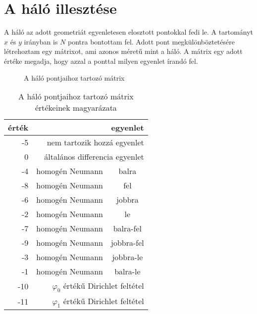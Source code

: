 \section{A háló illesztése}
A háló az adott geometriát egyenletesen elosztott pontokkal fedi le.
A tartományt $x$ és $y$ irányban is $N$ pontra bontottam fel.
Adott pont megkülönböztetésére létrehoztam egy mátrixot, ami azonos méretű mint a háló.
A mátrix egy adott értéke megadja, hogy azzal a ponttal milyen egyenlet írandó fel.
\begin{figure}[H]
\centering
\caption{A háló pontjaihoz tartozó mátrix} 
\end{figure}
\begin{table}
\centering
\begin{tabular}{|r|rc|}
\hline
érték & \multicolumn{2}{r|}{egyenlet}\\
\hline\hline
-5 & \multicolumn{2}{r|}{nem tartozik hozzá egyenlet}\\
0 & \multicolumn{2}{r|}{általános differencia egyenlet}\\
\hline
-4 & homogén Neumann & balra\\
-8 & homogén Neumann & fel\\
-6 & homogén Neumann & jobbra\\
-2 & homogén Neumann & le\\
-7 & homogén Neumann & balra-fel\\
-9 & homogén Neumann & jobbra-fel\\
-3 & homogén Neumann & jobbra-le\\
-1 & homogén Neumann & balra-le\\
\hline
-10 & \multicolumn{2}{r|}{$\varphi_0$ értékű Dirichlet feltétel}\\
-11 & \multicolumn{2}{r|}{$\varphi_1$ értékű Dirichlet feltétel}\\
\hline
\end{tabular}
\caption{A háló pontjaihoz tartozó mátrix értékeinek magyarázata} 
\end{table}


